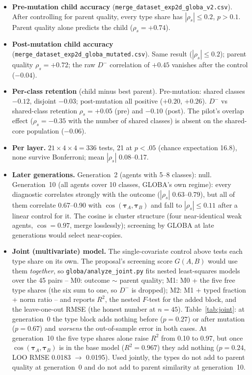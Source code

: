 \documentclass[11pt,a4paper]{article}
\newcommand{\tauv}{\boldsymbol{\tau}}
\newcommand{\Dm}{D^{-}}
\newcommand{\code}[1]{\texttt{#1}}
\begin{document}
\begin{itemize}[nosep]
\item \textbf{Pre-mutation child accuracy} (\code{merge\_dataset\_exp2d\_globa\_v2.csv}). After controlling for parent quality, every type share has $|\rho_s|\le 0.2$, $p>0.1$. Parent quality alone predicts the child ($\rho_s=+0.74$).
\item \textbf{Post-mutation child accuracy} (\code{merge\_dataset\_exp2d\_globa\_mutated.csv}). Same result ($|\rho_s|\le0.2$); parent quality $\rho_s=+0.72$; the raw $\Dm$ correlation of $+0.45$ vanishes after the control ($-0.04$).
\item \textbf{Per-class retention} (child minus best parent). Pre-mutation: shared classes $-0.12$, disjoint $-0.03$; post-mutation all positive ($+0.20$, $+0.26$). $\Dm$ vs shared-class retention $\rho_s=+0.05$ (pre) and $-0.10$ (post). The pilot's overlap effect ($\rho_s=-0.35$ with the number of shared classes) is absent on the shared-core population ($-0.06$).
\item \textbf{Per layer.} $21\times4\times4=336$ tests, 21 at $p<.05$ (chance expectation 16.8), none survive Bonferroni; mean $|\rho_s|$ 0.08--0.17.
\item \textbf{Later generations.} Generation~2 (agents with 5--8 classes): null. Generation~10 (all agents cover 10 classes, GLOBA's own regime): every diagnostic correlates strongly with the outcome ($|\rho_s|$ 0.63--0.79), but all of them correlate 0.67--0.90 with $\cos(\tauv_A,\tauv_B)$ and fall to $|\rho_s|\le 0.11$ after a linear control for it. The cosine is cluster structure (four near-identical weak agents, $\cos=0.97$, merge losslessly); screening by GLOBA at late generations would select near-copies.
\item \textbf{Joint (multivariate) model.} The single-covariate control above tests each type share on its own. The proposal's screening score $G(A,B)$ would use them \emph{together}, so \code{globa/analyze\_joint.py} fits nested least-squares models over the 45 pairs -- M0: outcome $\sim$ parent quality; M1: M0 + the five free type shares (the six sum to one, so $\Dm$ is dropped); M2: M1 + typed fraction + norm ratio -- and reports $R^2$, the nested $F$-test for the added block, and the leave-one-out RMSE (the honest number at $n=45$). Table~\ref{tab:joint}: at generation~0 the type block adds nothing before ($p=0.27$) or after mutation ($p=0.67$) and \emph{worsens} the out-of-sample error in both cases. At generation~10 the five type shares alone raise $R^2$ from 0.10 to 0.97, but once $\cos(\tauv_A,\tauv_B)$ is in the base model ($R^2=0.967$) they add nothing ($p=0.24$, LOO RMSE 0.0183 $\to$ 0.0195). Used jointly, the types do not add to parent quality at generation~0 and do not add to parent similarity at generation~10.

\end{itemize}
\end{document}
